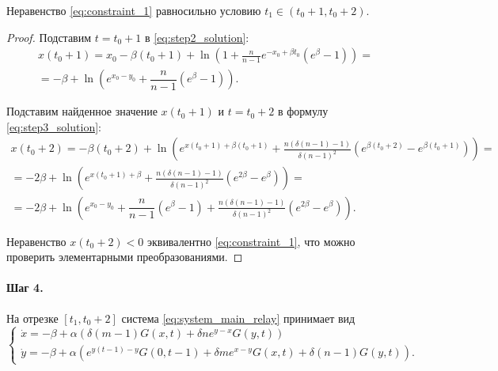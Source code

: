 \begin{lemma}
	\label{lm:t1_one_step}
	Неравенство \eqref{eq:constraint_1} равносильно условию $t_1 \in (t_0 + 1, t_0 + 2)$.
\end{lemma}
\begin{proof}
	Подставим $t = t_0 + 1$ в \eqref{eq:step2_solution}:
	\begin{multline*}
		x(t_0 + 1) = x_0 - \beta (t_0 + 1) + \ln\left(1 + \frac{n}{n - 1} e^{-x_0 + \beta t_0}  (e^{\beta} - 1)\right) =\\= -\beta + \ln\left(e^{x_0 - y_0} + \dfrac{n}{n - 1}(e^{\beta} - 1)\right).
	\end{multline*}
	
	Подставим найденное значение $x(t_0 + 1)$ и $t = t_0 + 2$ в формулу \eqref{eq:step3_solution}:
	\small
	\begin{multline*}
		x(t_0 + 2) = -\beta (t_0 + 2) + \ln\left(e^{x(t_0 + 1) + \beta (t_0 + 1)} + \frac{n (\delta(n - 1) - 1)}{\delta (n - 1)^2} (e^{\beta (t_0 + 2)} - e^{\beta (t_0 + 1)})\right) = \\ = -2\beta + \ln\left(e^{x(t_0 + 1) + \beta} + \frac{n (\delta(n - 1) - 1)}{\delta (n - 1)^2} (e^{2\beta} - e^{\beta})\right) = \\ = -2\beta + \ln\left(e^{x_0 - y_0} + \dfrac{n}{n - 1}(e^{\beta} - 1) + \frac{n (\delta(n - 1) - 1)}{\delta (n - 1)^2} (e^{2\beta} - e^{\beta})\right).
	\end{multline*}
	\normalsize
	
	Неравенство $x(t_0 + 2) < 0$ эквивалентно \eqref{eq:constraint_1}, что можно проверить элементарными преобразованиями.
\end{proof}

\paragraph{Шаг 4.} На отрезке $[t_1, t_0 + 2]$ система \eqref{eq:system_main_relay} принимает вид
\small
\begin{equation}
	\begin{cases}
		\dot{x} = -\beta + \alpha \left(\delta (m - 1) G(x, t) + \delta n e^{y - x} G(y, t)\right)\\
		\dot{y} = -\beta + \alpha \left(e^{y(t - 1) - y} G(0, t - 1) + \delta m e^{x - y} G(x, t) + \delta (n - 1) G(y, t)\right).
	\end{cases}
\end{equation}
\normalsize

